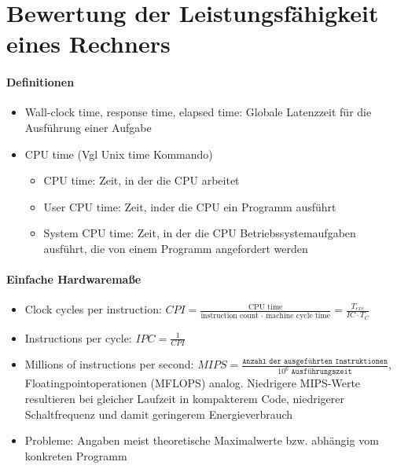 \section{Bewertung der Leistungsfähigkeit eines Rechners}
	\paragraph{Definitionen}
		\begin{itemize}
			\item Wall-clock time, response time, elapsed time: Globale Latenzzeit für die Ausführung einer Aufgabe
			\item CPU time (Vgl Unix time Kommando)
			\begin{itemize}
				\item CPU time: Zeit, in der die CPU arbeitet
				\item User CPU time: Zeit, inder die CPU ein Programm ausführt
				\item System CPU time: Zeit, in der die CPU Betriebssystemaufgaben ausführt, die von einem Programm angefordert werden
			\end{itemize}
		\end{itemize}

	\paragraph{Einfache Hardwaremaße}
		\begin{itemize}
			\item Clock cycles per instruction: \(CPI = \frac{\text{CPU time}}{\text{instruction count } \cdot \text{ machine cycle time}} = \frac{T_{exe}}{IC \cdot T_C}\)
			\item Instructions per cycle: \(IPC = \frac{1}{CPI}\)
			\item Millions of instructions per second: \(MIPS = \frac{\texttt{Anzahl der ausgeführten Instruktionen}}{10^6 \texttt{ Ausführungszeit}}\), Floatingpointoperationen (MFLOPS) analog. Niedrigere MIPS-Werte resultieren bei gleicher Laufzeit in kompakterem Code, niedrigerer Schaltfrequenz und damit geringerem Energieverbrauch
			\item Probleme: Angaben meist theoretische Maximalwerte bzw. abhängig vom konkreten Programm 
		\end{itemize}

